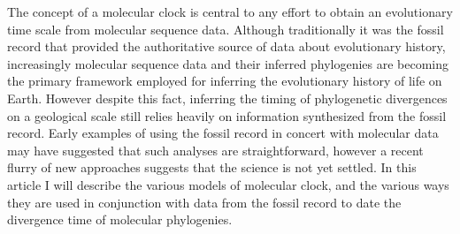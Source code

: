 The concept of a molecular clock is central to any effort to obtain an evolutionary time scale from molecular sequence data.
Although traditionally it was the fossil record that provided the authoritative source of data about evolutionary history, increasingly molecular sequence data and their inferred phylogenies are becoming the primary framework employed for inferring the evolutionary history of life on Earth. However despite this fact, inferring the timing of phylogenetic divergences on a geological scale still relies heavily on information synthesized from the fossil record. Early examples of using the fossil record in concert with molecular data may have suggested that such analyses are straightforward, however a recent flurry of new approaches suggests that the science is not yet settled. In this article I will describe the various models of molecular clock, and the various ways they are used in conjunction with data from the fossil record to date the divergence time of molecular phylogenies.
